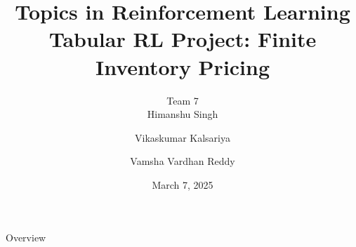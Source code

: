 \documentclass[9pt]{slides}
\title{{\normalsize Topics in Reinforcement Learning} \\ \vspace{0.5em} Tabular RL Project: Finite Inventory Pricing}
\author{Team 7 \\ \vspace{0.5em} Himanshu Singh \and Vikaskumar Kalsariya \and Vamsha Vardhan Reddy}
\date{March 7, 2025}
\begin{document}
\begin{frame}
    \titlepage
\end{frame}

\begin{frame}{Overview}
    \tableofcontents
\end{frame}




\end{document}
